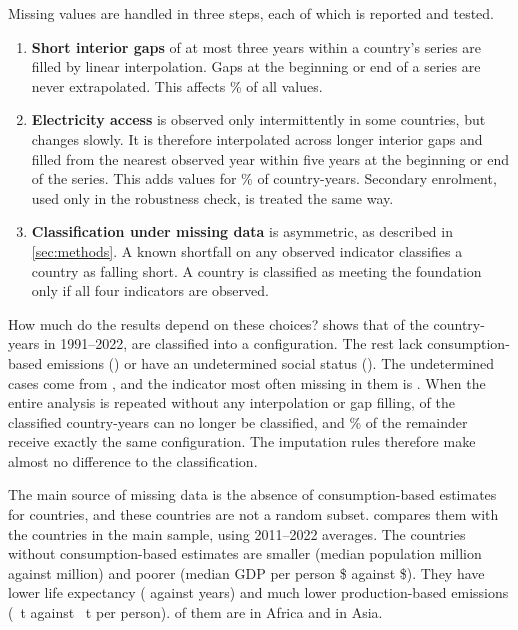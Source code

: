 Missing values are handled in three steps, each of which is reported and tested.
\begin{enumerate}
\item \textbf{Short interior gaps} of at most three years within a country's series are filled by linear interpolation. Gaps at the beginning or end of a series are never extrapolated. This affects \nPctInterpolated\% of all values.
\item \textbf{Electricity access} is observed only intermittently in some countries, but changes slowly. It is therefore interpolated across longer interior gaps and filled from the nearest observed year within five years at the beginning or end of the series. This adds values for \nPctFilledElectricity\% of country-years. Secondary enrolment, used only in the robustness check, is treated the same way.
\item \textbf{Classification under missing data} is asymmetric, as described in \cref{sec:methods}. A known shortfall on any observed indicator classifies a country as falling short. A country is classified as meeting the foundation only if all four indicators are observed.
\end{enumerate}

How much do the results depend on these choices?  shows that of the \nCsTotal{} country-years in 1991--2022, \nCsClassified{} are classified into a configuration. The rest lack consumption-based emissions (\nCsNoCO) or have an undetermined social status (\nCsUndetermined). The undetermined cases come from \nCsUndCountries, and the indicator most often missing in them is \nCsUndTopIndicator. When the entire analysis is repeated without any interpolation or gap filling, \nFillOnlyMain{} of the \nFillClassified{} classified country-years can no longer be classified, and \nFillSameShare\% of the remainder receive exactly the same configuration. The imputation rules therefore make almost no difference to the classification.

The main source of missing data is the absence of consumption-based estimates for \nMissOutN{} countries, and these countries are not a random subset.  compares them with the \nMissInN{} countries in the main sample, using 2011--2022 averages. The countries without consumption-based estimates are smaller (median population \nMissPopOut{} million against \nMissPopIn{} million) and poorer (median GDP per person \$\nMissGdpOut{} against \$\nMissGdpIn). They have lower life expectancy (\nMissLEOut{} against \nMissLEIn{} years) and much lower production-based emissions (\nMissProdOut~t against \nMissProdIn~t per person). \nMissOutAfrica{} of them are in Africa and \nMissOutAsia{} in Asia.

